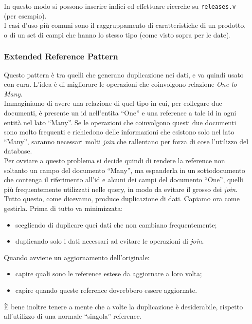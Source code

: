 \noindent In questo modo si possono inserire indici ed effettuare ricerche su \texttt{releases.v} (per esempio).\\
I casi d'uso più comuni sono il raggruppamento di caratteristiche di un prodotto, o di un set di campi che hanno lo stesso tipo (come visto sopra per le date).

\subsubsection{Extended Reference Pattern}
Questo pattern è tra quelli che generano duplicazione nei dati, e va quindi usato con cura.
L'idea è di migliorare le operazioni che coinvolgono relazione \textit{One to Many}.\\
Immaginiamo di avere una relazione di quel tipo in cui, per collegare due documenti, è presente un id nell'entita ``One'' e una reference a tale id in ogni entità nel lato ``Many''. Se le operazioni che coinvolgono questi due documenti sono molto frequenti e richiedono delle informazioni che esistono solo nel lato ``Many'', saranno necessari molti \textit{join} che rallentano per forza di cose l'utilizzo del database.\\
Per ovviare a questo problema si decide quindi di rendere la reference non soltanto un campo del documento ``Many'', ma espanderla in un sottodocumento che contenga il riferimento all'id e alcuni dei campi del documento ``One'', quelli più frequentemente utilizzati nelle query, in modo da evitare il grosso dei \textit{join}.\\
Tutto questo, come dicevamo, produce duplicazione di dati. Capiamo ora come gestirla.
Prima di tutto va minimizzata:
\begin{itemize}
    \item scegliendo di duplicare quei dati che non cambiano frequentemente;
    \item duplicando solo i dati necessari ad evitare le operazioni di \textit{join}.
\end{itemize}
\noindent Quando avviene un aggiornamento dell'originale:
\begin{itemize}
    \item capire quali sono le reference estese da aggiornare a loro volta;
    \item capire quando queste reference dovrebbero essere aggiornate.
\end{itemize}
\noindent È bene inoltre tenere a mente che a volte la duplicazione è desiderabile, rispetto all'utilizzo di una normale ``singola'' reference.

